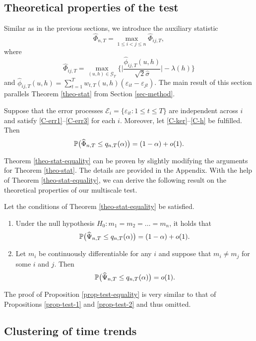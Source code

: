 \documentclass[a4paper,12pt]{article}
\numberwithin{equation}{section}
\begin{document}
\subsection{Theoretical properties of the test}\label{subsec-test-equality-theo}


Similar as in the previous sections, we introduce the auxiliary statistic 
\[ \widehat{\Phi}_{n,T} = \max_{1 \le i < j \le n} \widehat{\Phi}_{ij,T}, \]
where
\[ \widehat{\Phi}_{ij,T} = \max_{(u,h) \in \mathcal{G}_T} \Big\{ \Big| \frac{\widehat{\phi}_{ij,T}(u,h)} {\sqrt{2}\widehat{\sigma}} \Big| - \lambda(h) \Big \} \]
and $\widehat{\phi}_{ij,T}(u,h) = \sum_{t=1}^T w_{t,T}(u,h) (\varepsilon_{it} - \varepsilon_{jt})$. The main result of this section parallels Theorem \ref{theo-stat} from Section \ref{sec-method}. 
\begin{theorem}\label{theo-stat-equality}
Suppose that the error processes $\mathcal{E}_i = \{ \varepsilon_{it}: 1 \le t \le T \}$ are independent across $i$ and satisfy \ref{C-err1}--\ref{C-err3} for each $i$. Moreover, let \ref{C-ker}--\ref{C-h} be fulfilled. Then 
\[ \mathbb{P} \big( \widehat{\Phi}_{n,T} \le q_{n,T}(\alpha) \big) = (1 - \alpha) + o(1). \]
\end{theorem}
Theorem \ref{theo-stat-equality} can be proven by slightly modifying the arguments for Theorem \ref{theo-stat}. The details are provided in the Appendix. With the help of Theorem \ref{theo-stat-equality}, we can derive the following result on the theoretical properties of our multiscale test. 
\begin{prop}\label{prop-test-equality}
Let the conditions  of Theorem \ref{theo-stat-equality} be satisfied. 
\begin{enumerate}[label=(\alph*),leftmargin=0.75cm]
\item Under the null hypothesis $H_0: m_1 = m_2 = \ldots = m_n$, it holds that 
\[ \mathbb{P} \big( \widehat{\Psi}_{n,T} \le q_{n,T}(\alpha) \big) = (1 - \alpha) + o(1). \]
\item Let $m_i$ be continuously differentiable for any $i$ and suppose that $m_i \ne m_j$ for some $i$ and $j$. Then 
\[ \mathbb{P} \big( \widehat{\Psi}_{n,T} \le q_{n,T}(\alpha) \big) = o(1). \]
\end{enumerate}
\end{prop}
The proof of Proposition \ref{prop-test-equality} is very similar to that of Propositions \ref{prop-test-1} and \ref{prop-test-2} and thus omitted. 


\subsection{Clustering of time trends}\label{subsec-test-equality-clustering}
\end{document}
